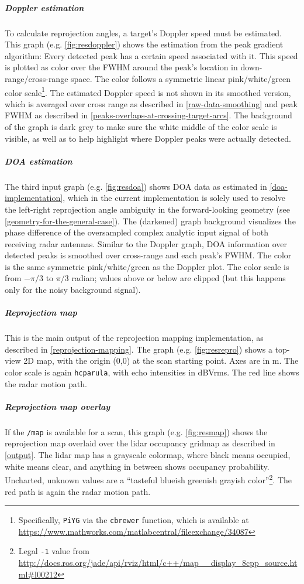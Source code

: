 \subparagraph{Doppler estimation}
To calculate reprojection angles, a target's Doppler speed must be estimated. This graph (e.g. \cref{fig:resdoppler}) shows the estimation from the peak gradient algorithm: Every detected peak has a certain speed associated with it. This speed is plotted as color over the FWHM around the peak's location in down-range/cross-range space. The color follows a symmetric linear pink/white/green color scale\footnote{Specifically, \texttt{PiYG} via the \texttt{cbrewer} function, which is available at \url{https://www.mathworks.com/matlabcentral/fileexchange/34087}}. The estimated Doppler speed is not shown in its smoothed version, which is averaged over cross range as described in \cref{raw-data-smoothing} and peak FWHM as described in \cref{peaks-overlaps-at-crossing-target-arcs}. The background of the graph is dark grey to make sure the white middle of the color scale is visible, as well as to help highlight where Doppler peaks were actually detected.

\subparagraph{DOA estimation}
The third input graph (e.g. \cref{fig:resdoa}) shows DOA data as estimated in \cref{doa-implementation}, which in the current implementation is solely used to resolve the left-right reprojection angle ambiguity in the forward-looking geometry (see \cref{geometry-for-the-general-case}). The (darkened) graph background visualizes the phase difference of the oversampled complex analytic input signal of both receiving radar antennas. Similar to the Doppler graph, DOA information over detected peaks is smoothed over cross-range and each peak's FWHM. The color is the same symmetric pink/white/green as the Doppler plot. The color scale is from $-\pi/3$ to $\pi/3$ radian; values above or below are clipped (but this happens only for the noisy background signal).

\subparagraph{Reprojection map}
This is the main output of the reprojection mapping implementation, as described in \cref{reprojection-mapping}. The graph (e.g. \cref{fig:resrepro}) shows a top-view 2D map, with the origin (0,0) at the scan starting point. Axes are in \si{m}. The color scale is again \texttt{hcparula}, with echo intensities in \si{dBVrms}. The red line shows the radar motion path.

\subparagraph{Reprojection map overlay}
If the \texttt{/map} is available for a scan, this graph (e.g. \cref{fig:resmap}) shows the reprojection map overlaid over the lidar occupancy gridmap as described in \cref{output}. The lidar map has a grayscale colormap, where black means occupied, white means clear, and anything in between shows occupancy probability. Uncharted, unknown values are a ``tasteful blueish greenish grayish color''\footnote{Legal \texttt{-1} value from \url{http://docs.ros.org/jade/api/rviz/html/c++/map\_\_display\_8cpp\_source.html\#l00212}}. The red path is again the radar motion path.


